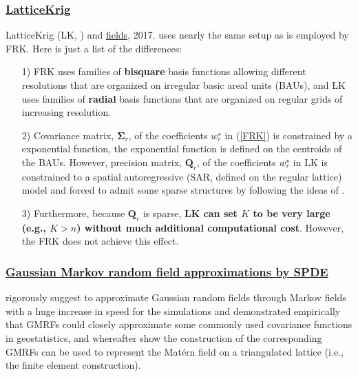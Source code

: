 \documentclass[
12pt, %
a4paper, %
oneside, %
headinclude,footinclude, %
BCOR5mm, %
]{scrartcl}
\begin{document}
\subsubsection{\href{https://chenyw68.github.io/Literature/[2020]LatticeKrigVignette.pdf}{LatticeKrig}}
LatticeKrig (LK, \href{https://chenyw68.github.io/Literature/[2015]A Multiresolution Gaussian Process Model for the Analysis of Large Spatial Datasets.pdf}{\citep{nychka2015multiresolution}}) and \href{https://chenyw68.github.io/Literature/[2020]fields.pdf}{fields}, 2017. uses nearly the same setup as is employed by FRK. Here is just a list of the differences:
\begin{itemize}
 \item [1)] FRK uses families of \textbf{bisquare} basis functions allowing different resolutions that are organized on \textcolor[rgb]{0.50,0.50,0.50}{irregular} basic areal units (BAUs), and LK uses families of \textbf{radial} basis functions that are organized on \textcolor[rgb]{0.50,0.50,0.50}{regular} grids of increasing resolution.
 \item [2)] Covariance matrix, $\boldsymbol{\Sigma}_r$, of the coefficients $w_r^{\star}$ in (\ref{FRK}) is constrained by a exponential function, the exponential function is defined on the centroids of the BAUs. However, precision matrix, $\boldsymbol{Q}_r$, of the coefficients $w_r^{\star}$ in LK is constrained to a spatial autoregressive (SAR, defined on the regular lattice) model and forced to admit some sparse structures by following the ideas of \href{https://chenyw68.github.io/Literature/[2011]An explicit link between GF and GMRFs the SPDE approach.pdf}{\citet{lindgren2011explicit}}.
 \item [3)] Furthermore, because $\boldsymbol{Q}_r$ is sparse, \textbf{LK can set $K$ to be very large (e.g.,  $K > n$) without much additional computational cost}. However, the FRK does not achieve this effect.
\end{itemize}

\subsubsection{\href{http://www.r-inla.org/}{Gaussian Markov random field approximations by SPDE}}
\href{https://chenyw68.github.io/Literature/[2005]Gaussian markov random fields theory and applications.pdf}{\citet{rue2005gaussian}} rigorously suggest to approximate \textcolor[rgb]{0.50,0.50,0.50}{Gaussian random fields} through \textcolor[rgb]{0.50,0.50,0.50}{Markov fields} with a huge increase in speed for the simulations and demonstrated empirically that GMRFs could
closely approximate some commonly used covariance functions in geostatistics, and whereafter \href{https://chenyw68.github.io/Literature/[2011]An explicit link between GF and GMRFs the SPDE approach.pdf}{\citet{lindgren2011explicit}} show the construction of the corresponding GMRFs can be used to represent the Matérn field on a triangulated lattice (i.e., the finite element construction).
\end{document}
